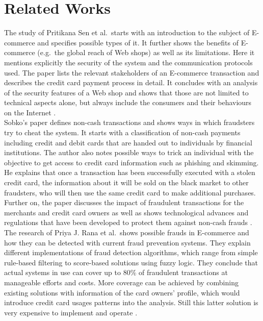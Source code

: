 
\chapter{Related Works}
\label{cha:related_works}

The study of Pritikana Sen et al.\ starts with an introduction to the subject of \gls{E-commerce} and specifies possible types of it. It further shows the benefits of \gls{E-commerce} (e.g.\ the global reach of Web shops) as well as its limitations. Here it mentions explicitly the security of the system and the communication protocols used. The paper lists the relevant stakeholders of an \gls{E-commerce} transaction and describes the credit card payment process in detail. It concludes with an analysis of the security features of a Web shop and shows that those are not limited to technical aspects alone, but always include the consumers and their behaviours on the Internet \citep{sen2015study}. \\

Sobko's paper defines non-cash transactions and shows ways in which fraudsters try to cheat the system. It starts with a classification of non-cash payments including credit and debit cards that are handed out to individuals by financial institutions. The author also notes possible ways to trick an individual with the objective to get access to credit card information such as phishing and skimming. He explains that once a transaction has been successfully executed with a stolen credit card, the information about it will be sold on the black market to other fraudsters, who will then use the same credit card to make additional purchases. Further on, the paper discusses the impact of fraudulent transactions for the merchants and credit card owners as well as shows technological advances and regulations that have been developed to protect them against non-cash frauds \citep{sobko2014fraud}. \\

The research of Priya J. Rana et al.\ shows possible frauds in \gls{E-commerce} and how they can be detected with current fraud prevention systems. They explain different implementations of fraud detection algorithms, which range from simple rule-based filtering to score-based solutions using fuzzy logic. They conclude that actual systems in use can cover up to 80\% of fraudulent transactions at manageable efforts and costs. More coverage can be achieved by combining existing solutions with information of the card owners' profile, which would introduce credit card usages patterns into the analysis. Still this latter solution is very expensive to implement and operate \citep{rana2015survey}. \\

